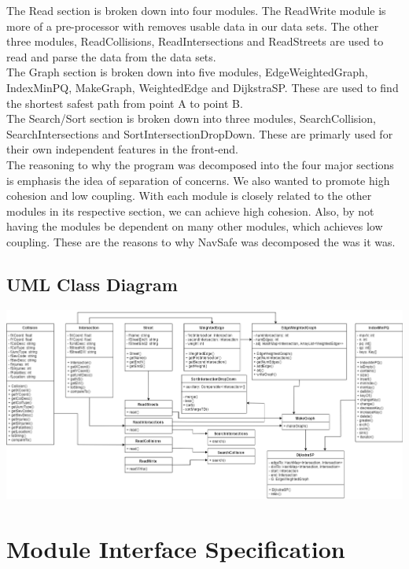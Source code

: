 \documentclass[12pt]{article}
\begin{document}
    \noindent The Read section is broken down into four modules. The ReadWrite module is more of a pre-processor with removes usable data in our data sets. The other three modules, ReadCollisions, ReadIntersections and ReadStreets are used to read and parse the data from the data sets.\\
    
    \noindent The Graph section is broken down into five modules, EdgeWeightedGraph, IndexMinPQ, MakeGraph, WeightedEdge and DijkstraSP. These are used to find the shortest safest path from point A to point B.\\
    
    \noindent The Search/Sort section is broken down into three modules, SearchCollision, SearchIntersections and SortIntersectionDropDown. These are primarly used for their own independent features in the front-end.\\
    
    \noindent The reasoning to why the program was decomposed into the four major sections is emphasis the idea of separation of concerns. We also wanted to promote high cohesion and low coupling. With each module is closely related to the other modules in its respective section, we can achieve high cohesion. Also, by not having the modules be dependent on many other modules, which achieves low coupling. These are the reasons to why NavSafe was decomposed the was it was.
    
    \subsection{UML Class Diagram}
    \includegraphics[angle=0, scale=0.3]{UML_Class_Diagram.png}

\newpage
\section{Module Interface Specification}
\end{document}
